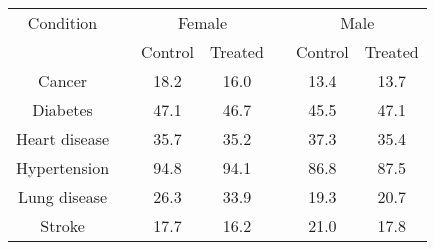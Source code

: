 \begin{tabular}{ccccccc}
\toprule
Condition && \multicolumn{2}{c}{Female} &  & \multicolumn{2}{c}{Male}\\
& & Control & Treated & & Control & Treated \\ \midrule
Cancer	&	&	18.2	&	16.0	&	&	13.4	&	13.7	\\
Diabetes	&	&	47.1	&	46.7	&	&	45.5	&	47.1	\\
Heart disease	&	&	35.7	&	35.2	&	&	37.3	&	35.4	\\
Hypertension	&	&	94.8	&	94.1	&	&	86.8	&	87.5	\\
Lung disease	&	&	26.3	&	33.9	&	&	19.3	&	20.7	\\
Stroke	&	&	17.7	&	16.2	&	&	21.0	&	17.8	\\
\bottomrule
\end{tabular}
